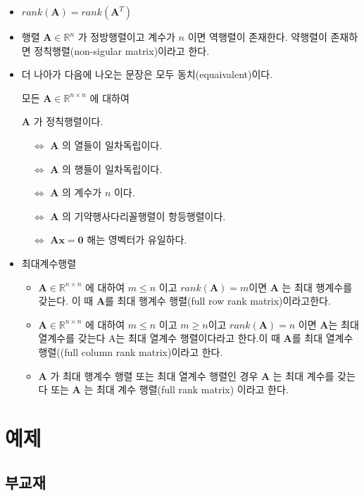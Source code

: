 \documentclass[
  11pt,
  a4paper,
  oneside]{scrbook}
\newcommand{\RR}{\mathbb{R}}
\theoremstyle{definition}
\theoremstyle{definition}
\theoremstyle{plain}
\theoremstyle{remark}
\begin{document}
\begin{itemize}
\item
  \(rank(\pmb A ) = rank(\pmb A^T)\)
\item
  행렬 \(\pmb A \in \RR^n\) 가 정방행렬이고 계수가 \(n\) 이면 역행렬이
  존재한다. 약행렬이 존재하면 정칙행렬(non-sigular matrix)이라고 한다.
\item
  더 나아가 다음에 나오는 문장은 모두 동치(equaivalent)이다.

  모든 \(\pmb A \in \RR^{n \times n}\) 에 대하여

  \(\pmb A\) 가 정칙행렬이다.

  \(\quad \Leftrightarrow\) \(\pmb A\) 의 열들이 일차독립이다.

  \(\quad \Leftrightarrow\) \(\pmb A\) 의 행들이 일차독립이다.

  \(\quad \Leftrightarrow\) \(\pmb A\) 의 계수가 \(n\) 이다.

  \(\quad \Leftrightarrow\) \(\pmb A\) 의 기약행사다리꼴행렬이
  항등행렬이다.

  \(\quad \Leftrightarrow\) \(\pmb A \pmb x = \pmb 0\) 해는 영벡터가
  유일하다.
\item
  최대계수행렬

  \begin{itemize}
  \item
    \(\pmb A \in \RR^{n \times n}\) 에 대하여 \(m \le n\) 이고
    \(rank(\pmb A) = m\)이면 \(\pmb A\) 는 최대 행계수를 갖는다. 이 때
    \(\pmb A\)를 최대 행계수 행렬(full row rank matrix)이라고한다.
  \item
    \(\pmb A \in \RR^{n \times n}\) 에 대하여 \(m \le n\) 이고
    \(m \ge n\)이고 \(rank(\pmb A) = n\) 이면 \(\pmb A\)는 최대 열계수를
    갖는다 A는 최대 열계수 행렬이다라고 한다.이 때 \(\pmb A\)를 최대
    열계수행렬((full column rank matrix)이라고 한다.
  \item
    \(\pmb A\) 가 최대 행계수 행렬 또는 최대 열계수 행렬인 경우
    \(\pmb A\) 는 최대 계수를 갖는다 또는 \(\pmb A\) 는 최대 계수
    행렬(full rank matrix) 이라고 한다.
  \end{itemize}
\end{itemize}

\section{예제}\label{uxc608uxc81c}

\subsection{부교재}\label{uxbd80uxad50uxc7ac}
\end{document}
